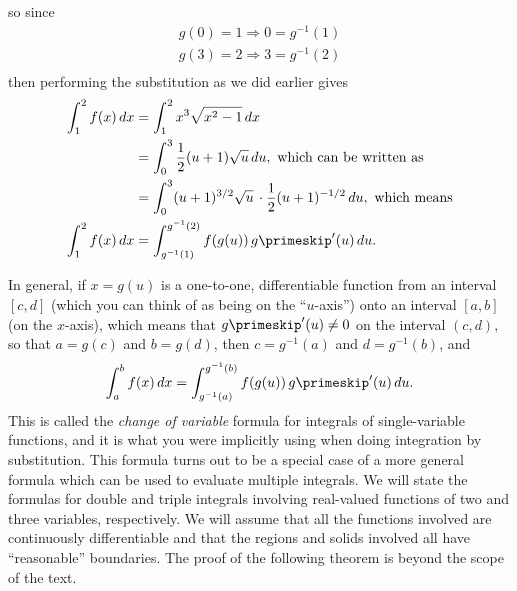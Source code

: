 so since
\begin{align*}
 g(0) = 1 \Rightarrow 0 = g^{-1} (1)\\
 g(3) = 2 \Rightarrow 3 = g^{-1} (2)\\
\end{align*}
then performing the substitution as we did earlier gives
\begin{align*}
 \int_1^2 f(x)\,dx &= \int_1^2 x^3 \sqrt{x^2 - 1}\,dx\\
 &= \int_0^3 \frac12(u+1)\sqrt{u}\,du ,\text{ which can be written as}\\
 &= \int_0^3 (u+1)^{3/2} \sqrt{u} \, \cdot \frac12 (u+1)^{-1/2}\,du ,\text{ which means}\\
 \int_1^2 f(x)\,dx &= \int_{g^{-1}(1)}^{g^{-1}(2)} f(g(u))\,g\primeskip'(u)\,du .
\end{align*}

In general, if $x = g(u)$ is a one-to-one, differentiable function from an interval $[ c,d ]$ (which you can think of as being on the ``$u$-axis'') onto an interval $[ a,b ]$ (on the $x$-axis), which means that $g\primeskip'(u) \ne 0$ on the interval $(c,d)$, so that $a=g(c)$ and $b=g(d)$, then $c=g^{-1}(a)$ and $d=g^{-1}(b)$, and
\[\int_a^b f(x)\,dx = \int_{g^{-1}(a)}^{g^{-1}(b)} f(g(u))\,g\primeskip'(u)\,du .\]
This is called the \emph{change of variable} formula for integrals of single-variable functions, and it is what you were implicitly using when doing integration by substitution. This formula turns out to be a special case of a more general formula which can be used to evaluate multiple integrals. We will state the formulas for double and triple integrals involving real-valued functions of two and three variables, respectively. We will assume that all the functions involved are continuously differentiable and that the regions and solids involved all have ``reasonable'' boundaries. The proof of the following theorem is beyond the scope of the text.%

